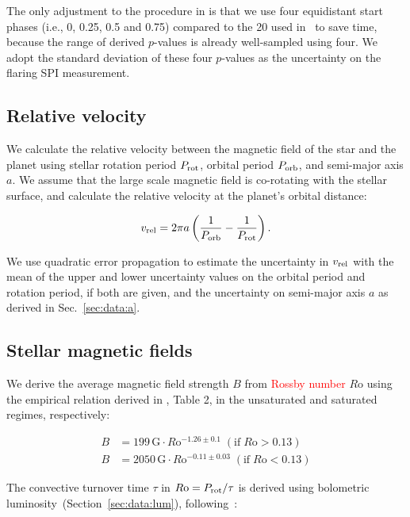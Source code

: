 \documentclass[twocolumn]{aastex631}
\begin{document}
The only adjustment to the procedure in \cite{ilin2022searching} is that we use four equidistant start phases (i.e., 0, 0.25, 0.5 and 0.75) compared to the 20 used in~\cite{ilin2022searching} to save time, because the range of derived $p$-values is already well-sampled using four. We adopt the standard deviation of these four $p$-values as the uncertainty on the flaring SPI measurement.



\subsection{Relative velocity}
\label{sec:methods:relvel}
We calculate the relative velocity between the magnetic field of the star and the planet using stellar rotation period $P_{\rm rot}$, orbital period $P_{\rm orb}$, and semi-major axis $a$. We assume that the large scale magnetic field is co-rotating with the stellar surface, and calculate the relative velocity at the planet's orbital distance:

\begin{equation}
    v_{\rm rel} = 2 \pi a \left(\frac{1}{P_{\rm orb}} - \frac{1}{P_{\rm rot}}\right).
\end{equation}

We use quadratic error propagation to estimate the uncertainty in $v_{\rm rel}$ with the mean of the upper and lower uncertainty values on the orbital period and rotation period, if both are given, and the uncertainty on semi-major axis $a$ as derived in Sec.~\ref{sec:data:a}. 

\subsection{Stellar magnetic fields}
\label{sec:methods:bfield}
We derive the average magnetic field strength $B$ from \textcolor{red}{Rossby number} $R$o using the empirical relation derived in \citet{reiners2022magnetism},  Table 2, in the unsaturated and saturated regimes, respectively:

\begin{eqnarray}
    B &= 199\,\text{G} \cdot R\mathrm{o}^{-1.26\pm 0.1} \;(\text{if}\; R\mathrm{o} > 0.13) \label{Eq3}\\
    B &= 2050\,\text{G} \cdot R\mathrm{o}^{-0.11\pm 0.03} \;(\text{if}\; R\mathrm{o} < 0.13) \label{Eq4}
\end{eqnarray} 

The convective turnover time $\tau$ in  $R \mathrm{o}=P_{\rm rot}/\tau$ is derived using bolometric luminosity~(Section~\ref{sec:data:lum}), following~\citet{reiners2014generalized, reiners2022magnetism}:
\end{document}
